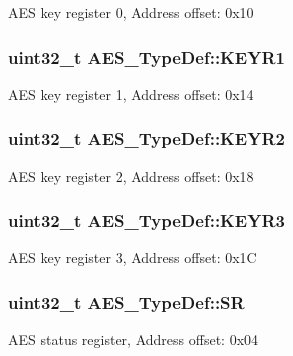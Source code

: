 A\-E\-S key register 0, Address offset\-: 0x10 \hypertarget{struct_a_e_s___type_def_a2755d099b5556ca661cad9c32eced4a4}{
\subsubsection[{K\-E\-Y\-R1}]{ uint32\-\_\-t A\-E\-S\-\_\-\-Type\-Def\-::\-K\-E\-Y\-R1}}\label{struct_a_e_s___type_def_a2755d099b5556ca661cad9c32eced4a4}
A\-E\-S key register 1, Address offset\-: 0x14 \hypertarget{struct_a_e_s___type_def_a415157c12229e50b4ae5e2dedfa37069}{
\subsubsection[{K\-E\-Y\-R2}]{ uint32\-\_\-t A\-E\-S\-\_\-\-Type\-Def\-::\-K\-E\-Y\-R2}}\label{struct_a_e_s___type_def_a415157c12229e50b4ae5e2dedfa37069}
A\-E\-S key register 2, Address offset\-: 0x18 \hypertarget{struct_a_e_s___type_def_ac4ed72833846f489d10cf751f552de7a}{
\subsubsection[{K\-E\-Y\-R3}]{ uint32\-\_\-t A\-E\-S\-\_\-\-Type\-Def\-::\-K\-E\-Y\-R3}}\label{struct_a_e_s___type_def_ac4ed72833846f489d10cf751f552de7a}
A\-E\-S key register 3, Address offset\-: 0x1\-C \hypertarget{struct_a_e_s___type_def_a567d574d42c57f0f5850eaada4eb1f31}{
\subsubsection[{S\-R}]{ uint32\-\_\-t A\-E\-S\-\_\-\-Type\-Def\-::\-S\-R}}\label{struct_a_e_s___type_def_a567d574d42c57f0f5850eaada4eb1f31}
A\-E\-S status register, Address offset\-: 0x04 

